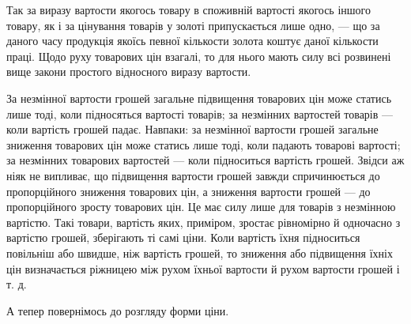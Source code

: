 Так за виразу вартости якогось товару в споживній вартості
якогось іншого товару, як і за цінування товарів у золоті припускається
лише одно, — що за даного часу продукція якоїсь певної
кількости золота коштує даної кількости праці. Щодо руху
товарових цін взагалі, то для нього мають силу всі розвинені
вище закони простого відносного виразу вартости.

За незмінної вартости грошей загальне підвищення товарових
цін може статись лише тоді, коли підносяться вартості товарів;
за незмінних вартостей товарів — коли вартість грошей
падає. Навпаки: за незмінної вартости грошей загальне зниження
товарових цін може статись лише тоді, коли падають
товарові вартості; за незмінних товарових вартостей — коли
підноситься вартість грошей. Звідси аж ніяк не випливає, що
підвищення вартости грошей завжди спричинюється до пропорційного
зниження товарових цін, а зниження вартости грошей —
до пропорційного зросту товарових цін. Це має силу лише для
товарів з незмінною вартістю. Такі товари, вартість яких, приміром,
зростає рівномірно й одночасно з вартістю грошей, зберігають
ті самі ціни. Коли вартість їхня підноситься повільніш
або швидше, ніж вартість грошей, то зниження або підвищення
їхніх цін визначається ріжницею між рухом їхньої вартости й
рухом вартости грошей і т. д.

А тепер повернімось до розгляду форми ціни.

